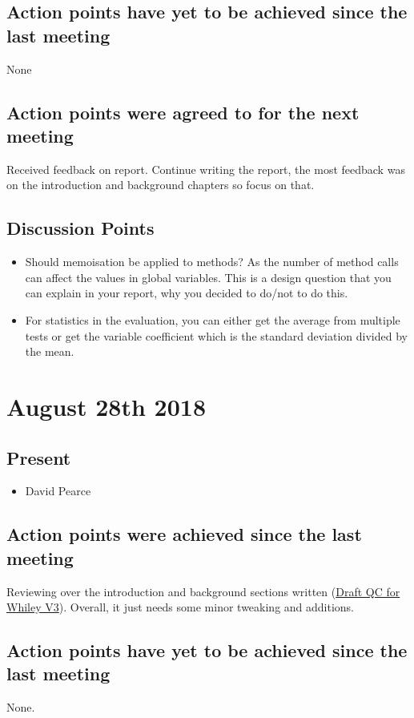 \documentclass[]{article}
\begin{document}
\subsection{Action points have yet to be achieved since the last meeting}
None
\subsection{Action points were agreed to for the next meeting}
Received feedback on report. 
Continue writing the report, the most feedback was on the introduction and background chapters so focus on that.
\subsection{Discussion Points}
\begin{itemize}
	\item  Should memoisation be applied to methods? As the number of method calls can affect the values in global variables. This is a design question that you can explain in your report, why you decided to do/not to do this.
	\item For statistics in the evaluation, you can either get the average from multiple tests or get the variable coefficient which is the standard deviation divided by the mean.
\end{itemize}

\section{August 28th 2018}
\subsection{Present}
\begin{itemize}
	\item David Pearce
\end{itemize}

\subsection{Action points were achieved since the last meeting}
Reviewing over the introduction and background sections written (\href{https://gitlab.ecs.vuw.ac.nz/project489-2018/chinjani/quickcheck-for-whiley-final-report/blob/master/Draft%20V3%20QuickCheck%20for%20Whiley%20-%20Janice%20Chin.pdf}{Draft QC for Whiley V3}). 
Overall, it just needs some minor tweaking and additions.
\subsection{Action points have yet to be achieved since the last meeting}
None.
\end{document}
